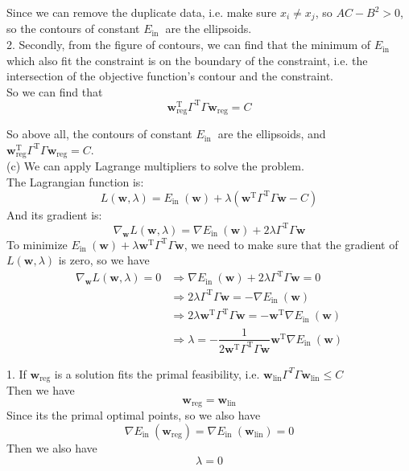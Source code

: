 Since we can remove the duplicate data, i.e. make sure $x_i\neq x_j$, so $AC-B^2>0$, so the contours of constant $E_{\text {in }}$ are the ellipsoids.\\

2. Secondly, from the figure of contours, we can find that the minimum of $E_{\text {in }}$ which also fit the constraint is on the boundary of the constraint, i.e. the intersection of the objective function's contour and the constraint.\\
So we can find that
$$\mathbf{w}_{\text{reg}}^{\mathrm{T}} \Gamma^{\mathrm{T}} \Gamma \mathbf{w}_{\mathrm{reg}}=C$$

So above all, the contours of constant $E_{\text {in }}$ are the ellipsoids, and $\mathbf{w}_{\text{reg}}^{\mathrm{T}} \Gamma^{\mathrm{T}} \Gamma \mathbf{w}_{\mathrm{reg}}=C$.\\

(c) We can apply Lagrange multipliers to solve the problem.\\
The Lagrangian function is:
$$L(\mathbf{w},\lambda)=E_{\text {in }}(\mathbf{w})+\lambda (\mathbf{w}^{\mathrm{T}} \Gamma^{\mathrm{T}} \Gamma \mathbf{w}-C)$$
And its gradient is:
$$\nabla_{\mathbf{w}}L(\mathbf{w},\lambda)=\nabla E_{\text {in }}(\mathbf{w})+2\lambda\Gamma^{\mathrm{T}} \Gamma \mathbf{w}$$
To minimize $E_{\text {in }}(\mathbf{w})+\lambda \mathbf{w}^{\mathrm{T}} \Gamma^{\mathrm{T}} \Gamma \mathbf{w}$, we need to make sure that the gradient of $L(\mathbf{w},\lambda)$ is zero, so we have
\begin{align*}
    \nabla_{\mathbf{w}}L(\mathbf{w},\lambda)=0 &\Rightarrow \nabla E_{\text {in }}(\mathbf{w})+2\lambda\Gamma^{\mathrm{T}} \Gamma \mathbf{w}=0 \\
    &\Rightarrow 2\lambda\Gamma^{\mathrm{T}} \Gamma \mathbf{w}=-\nabla E_{\text {in }}(\mathbf{w}) \\
    &\Rightarrow 2\lambda\mathbf{w}^{\mathrm{T}} \Gamma^{\mathrm{T}} \Gamma \mathbf{w}=-\mathbf{w}^{\mathrm{T}} \nabla E_{\text {in }}(\mathbf{w}) \\ 
    &\Rightarrow \lambda=-\dfrac{1}{2\mathbf{w}^{\mathrm{T}} \Gamma^{\mathrm{T}} \Gamma \mathbf{w}}\mathbf{w}^{\mathrm{T}} \nabla E_{\text {in }}(\mathbf{w})
\end{align*}

1. If $\mathbf{w}_{\text{reg}}$ is a solution fits the primal feasibility, i.e. $\mathbf{w}_{\text{lin}}\Gamma^{T} \Gamma \mathbf{w}_{\text{lin}}\leq C$\\
Then we have
$$\mathbf{w}_{\text{reg}}=\mathbf{w}_{\text{lin}}$$
Since its the primal optimal points, so we also have
$$\nabla E_{\text {in }}(\mathbf{w}_{\text{reg}})=\nabla E_{\text {in }}(\mathbf{w}_{\text{lin}}) = 0$$
Then we also have
$$\lambda = 0$$


